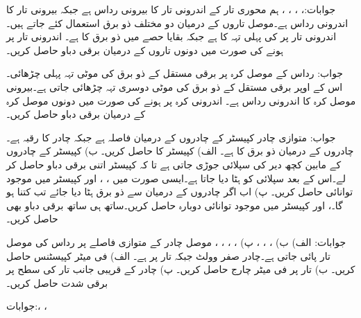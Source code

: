 جوابات:، ، ، ،  
ہم محوری تار کے اندرونی تار کا بیرونی رداس  ہے جبکہ بیرونی تار کا اندرونی رداس  ہے۔موصل تاروں کے درمیان دو مختلف ذو برق استعمال کئے جاتے ہیں۔ اندرونی تار پر  کی پہلی تہہ کا  ہے جبکہ بقایا حصے میں ذو برق کا  ہے۔ اندرونی تار پر  ہونے کی صورت میں دونوں تاروں کے درمیان برقی دباو حاصل کریں۔

جواب:
رداس  کے موصل کرہ پر  برقی مستقل کے ذو برق کی  موٹی تہہ پہلی چڑھائی۔اس کے اوپر  برقی مستقل کے ذو برق کی  موٹی دوسری تہہ چڑھائی جاتی ہے۔بیرونی موصل کرہ کا اندرونی رداس  ہے۔ اندرونی کرہ پر  ہونے کی صورت میں دونوں موصل کرہ کے درمیان برقی دباو حاصل کریں۔

جواب:
متوازی چادر کپیسٹر کے چادروں کے درمیان فاصلہ  ہے جبکہ چادر کا رقبہ  ہے۔چادروں کے درمیان ذو برق کا  ہے۔ الف) کپیسٹر کا  حاصل کریں۔ ب) کپیسٹر کے چادروں کے مابین کچھ دیر  کی سپلائی جوڑی جاتی ہے تا کہ کپیسٹر اتنی  برقی دباو حاصل کر لے۔اس کے بعد سپلائی کو ہٹا دیا جاتا ہے۔ایسی صورت میں ، ،  اور کپیسٹر میں موجود توانائی  حاصل کریں۔ پ) اب اگر چادروں کے درمیان سے ذو برق ہٹا دیا جائے تب  کتنا ہو گا۔،  اور کپیسٹر میں موجود توانائی  دوبارہ حاصل کریں۔ساتھ ہی ساتھ برقی دباو بھی حاصل کریں۔ 

جوابات: الف)  ب) ، ، ،  پ) ، ، ، ، 
موصل چادر کے متوازی  فاصلے پر  رداس کی موصل تار پائی جاتی ہے۔چادر صفر وولٹ جبکہ تار  پر ہے۔ الف) فی میٹر کپیسٹنس حاصل کریں۔ ب) تار پر فی میٹر چارج حاصل کریں۔ پ) چادر کے قریبی جانب تار کی سطح پر برقی شدت حاصل کریں۔

جوابات:، ، 


